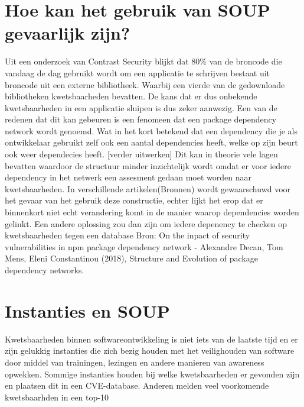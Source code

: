 
\section{Hoe kan het gebruik van SOUP gevaarlijk zijn?}\label{sec:hoe-kan-het-gebruik-van-soup-gevaarlijk-zijn?}
Uit een onderzoek van Contrast Security blijkt dat 80\% van de broncode die vandaag de dag gebruikt wordt om een applicatie te schrijven bestaat uit broncode uit een externe bibliotheek.
Waarbij een vierde van de gedownloade bibliotheken kwetsbaarheden bevatten.
De kans dat er dus onbekende kwetsbaarheden in een applicatie sluipen is dus zeker aanwezig.
Een van de redenen dat dit kan gebeuren is een fenomeen dat een package dependency network wordt genoemd.
Wat in het kort betekend dat een dependency die je als ontwikkelaar gebruikt zelf ook een aantal dependencies heeft, welke op zijn beurt ook weer dependecies heeft.
[verder uitwerken]
Dit kan in theorie vele lagen bevatten waardoor de structuur minder inzichtelijk wordt omdat er voor iedere dependency in het netwerk een assesment gedaan moet worden naar kwetsbaarheden.
In verschillende artikelen(Bronnen) wordt gewaarschuwd voor het gevaar van het gebruik deze constructie, echter lijkt het erop dat er binnenkort niet echt verandering komt in de manier waarop dependencies worden gelinkt.
Een andere oplossing zou dan zijn om iedere depenency te checken op kwetsbaarheden tegen een database
Bron: On the inpact of security vulnerabilities in npm package dependency network - Alexandre Decan, Tom Mens, Eleni Constantinou (2018), Structure and Evolution of package dependency networks.

\section{Instanties en SOUP}\label{sec:instanties-en-soup}
Kwetsbaarheden binnen softwareontwikkeling is niet iets van de laatste tijd en er zijn gelukkig instanties die zich bezig houden met het veilighouden van software door middel van trainingen, lezingen en andere manieren van awareness opwekken.
Sommige instanties houden bij welke kwetsbaarheden er gevonden zijn en plaatsen dit in een CVE-database.
Anderen melden veel voorkomende kwetsbaarhden in een top-10

